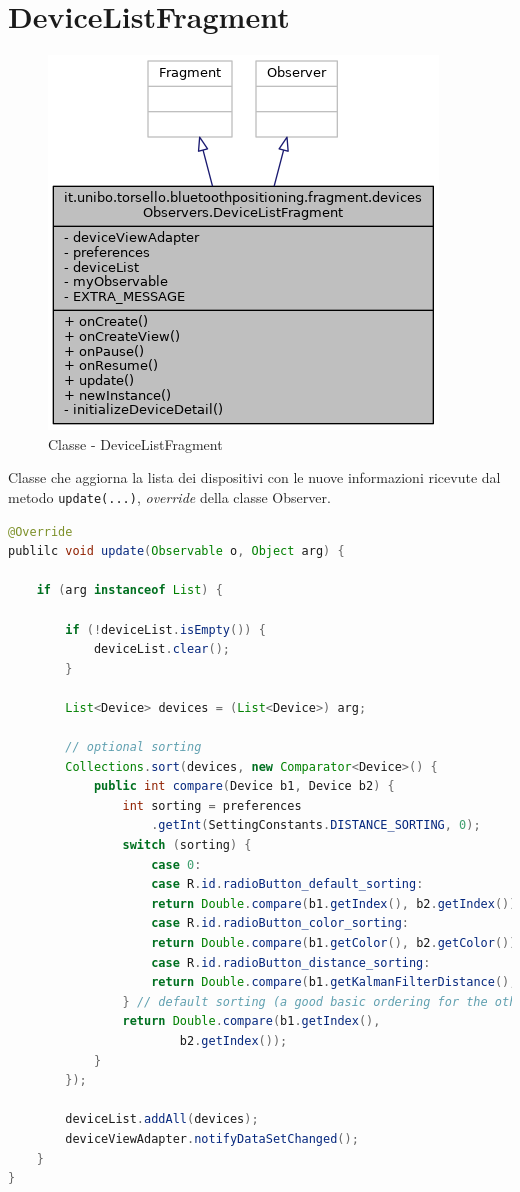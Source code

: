\newpage
\section{DeviceListFragment}\label{ch:device_list}
\begin{figure}[ph]
	\centering
	\includegraphics[width=0.5\linewidth]{img/uml/class/classit_1_1unibo_1_1torsello_1_1bluetoothpositioning_1_1fragment_1_1devicesObservers_1_1DeviceListFragment__inherit__graph.png}
	\caption{Classe - DeviceListFragment}
\end{figure}

Classe che aggiorna la lista dei dispositivi con le nuove informazioni ricevute dal metodo \texttt{update(...)}, \textit{override} della classe Observer.
\begin{lstlisting}[language=Java]
@Override
publilc void update(Observable o, Object arg) {
	
	if (arg instanceof List) {
		
		if (!deviceList.isEmpty()) {
			deviceList.clear();
		}
		
		List<Device> devices = (List<Device>) arg;
		
		// optional sorting
		Collections.sort(devices, new Comparator<Device>() {
			public int compare(Device b1, Device b2) {
				int sorting = preferences
					.getInt(SettingConstants.DISTANCE_SORTING, 0);
				switch (sorting) {
					case 0:
					case R.id.radioButton_default_sorting:
					return Double.compare(b1.getIndex(), b2.getIndex());
					case R.id.radioButton_color_sorting:
					return Double.compare(b1.getColor(), b2.getColor());
					case R.id.radioButton_distance_sorting:
					return Double.compare(b1.getKalmanFilterDistance(), b2.getKalmanFilterDistance());
				} // default sorting (a good basic ordering for the other options)
				return Double.compare(b1.getIndex(), 
						b2.getIndex());
			}
		});
		
		deviceList.addAll(devices);
		deviceViewAdapter.notifyDataSetChanged();
	}
}
\end{lstlisting}

